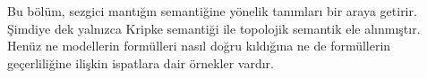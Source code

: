 \documentclass[../../../include/open-logic-chapter]{subfiles}
\begin{document}

\begin{editorial}
  Bu bölüm, sezgici mantığın semantiğine yönelik tanımları bir araya getirir.
  Şimdiye dek yalnızca Kripke semantiği ile topolojik semantik ele alınmıştır.
  Henüz ne modellerin formülleri nasıl doğru kıldığına ne de formüllerin
  geçerliliğine ilişkin ispatlara dair örnekler vardır.
\end{editorial}


\OLEndChapterHook
\end{document}
